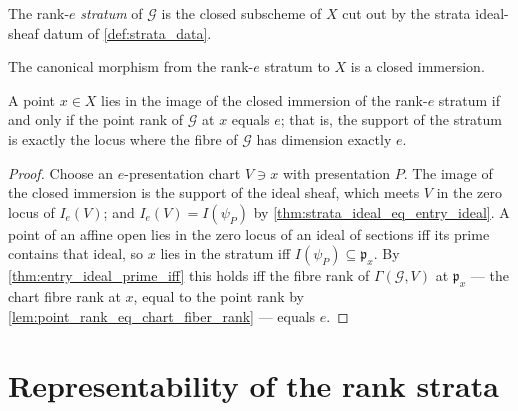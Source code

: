 \begin{definition}
  \label{def:stratum}
  \leanok
  The rank-\(e\) \emph{stratum} of \(\mathcal G\) is the closed subscheme of
  \(X\) cut out by the strata ideal-sheaf datum of \cref{def:strata_data}.
\end{definition}

\begin{definition}
  \label{def:stratum_immersion}
  \leanok
  The canonical morphism from the rank-\(e\) stratum to \(X\) is a closed
  immersion.
\end{definition}

\begin{theorem}
  \label{thm:mem_range_stratum}
  \leanok
  A point \(x \in X\) lies in the image of the closed immersion of the
  rank-\(e\) stratum if and only if the point rank of \(\mathcal G\) at \(x\)
  equals \(e\); that is, the support of the stratum is exactly the locus where
  the fibre of \(\mathcal G\) has dimension exactly \(e\).
\end{theorem}

\begin{proof}
  \leanok
  Choose an \(e\)-presentation chart \(V \ni x\) with presentation \(P\).  The
  image of the closed immersion is the support of the ideal sheaf, which meets
  \(V\) in the zero locus of \(I_e(V)\); and \(I_e(V) = I(\psi_P)\) by
  \cref{thm:strata_ideal_eq_entry_ideal}.  A point of an affine open lies in
  the zero locus of an ideal of sections iff its prime contains that ideal, so
  \(x\) lies in the stratum iff \(I(\psi_P) \subseteq \mathfrak p_x\).  By
  \cref{thm:entry_ideal_prime_iff} this holds iff the fibre rank of
  \(\Gamma(\mathcal G, V)\) at \(\mathfrak p_x\) --- the chart fibre rank at
  \(x\), equal to the point rank by
  \cref{lem:point_rank_eq_chart_fiber_rank} --- equals \(e\).
\end{proof}

\section{Representability of the rank strata}
\label{sec:flatstrat_representability}

